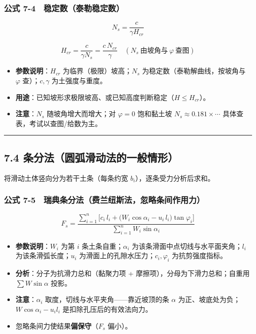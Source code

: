\documentclass[
]{article}
\providecommand{\tightlist}{%
  \setlength{\itemsep}{0pt}\setlength{\parskip}{0pt}}
\begin{document}
\subsubsection{公式
7-4　稳定数（泰勒稳定数）}\label{ux516cux5f0f-7-4-ux7a33ux5b9aux6570ux6cf0ux52d2ux7a33ux5b9aux6570}

\[N_s=\frac{c}{\gamma H_{cr}}\]

\[H_{cr}=\frac{c}{\gamma N_s}=\frac{c\,N_{cr}}{\gamma}\quad(N_s\ \text{由坡角与}\ \varphi\ \text{查图})\]

\begin{itemize}
\tightlist
\item
  \textbf{参数说明}：\(H_{cr}\) 为临界（极限）坡高；\(N_s\)
  为稳定数（泰勒解曲线，按坡角与 \(\varphi\) 查）；\(c,\gamma\)
  为土强度与重度。
\item
  \textbf{用途}：已知坡形求极限坡高、或已知高度判断稳定（\(H\le H_{cr}\)）。
\item
  \textbf{注意}：\(N_s\) 随坡角增大而增大；对 \(\varphi=0\) 饱和黏土坡
  \(N_s\approx0.181\times\cdots\) 具体查表，考试以查图/给数为主。
\end{itemize}

\begin{center}\rule{0.5\linewidth}{0.5pt}\end{center}

\subsection{7.4
条分法（圆弧滑动法的一般情形）}\label{ux6761ux5206ux6cd5ux5706ux5f27ux6ed1ux52a8ux6cd5ux7684ux4e00ux822cux60c5ux5f62}

将滑动土体竖向分为若干土条（每条约宽 \(b_i\)），逐条受力分析后求和。

\subsubsection{公式
7-5　瑞典条分法（费兰纽斯法，忽略条间作用力）}\label{ux516cux5f0f-7-5-ux745eux5178ux6761ux5206ux6cd5ux8d39ux5170ux7ebdux65afux6cd5ux5ffdux7565ux6761ux95f4ux4f5cux7528ux529b}

\[\boxed{F_s=\frac{\sum\limits_{i=1}^{n}\Big[c_i\,l_i+\big(W_i\cos\alpha_i-u_i\,l_i\big)\tan\varphi_i\Big]}{\sum\limits_{i=1}^{n}W_i\sin\alpha_i}}\]

\begin{itemize}
\tightlist
\item
  \textbf{参数说明}：\(W_i\) 为第 \(i\) 条土条自重；\(\alpha_i\)
  为该条滑面中点切线与水平面夹角；\(l_i\) 为该条滑弧长度；\(u_i\)
  为滑面上的孔隙水压力；\(c_i,\varphi_i\) 为抗剪强度指标。
\item
  \textbf{分析}：分子为抗滑力总和（黏聚力项 +
  摩擦项），分母为下滑力总和；自重用 \(\sum W\sin\alpha\) 投影。
\item
  \textbf{注意}：\(\alpha_i\) 取度，切线与水平夹角------靠近坡顶的条
  \(\alpha\) 为正、坡底处为负；\(W\cos\alpha_i-u_il_i\)
  是扣除孔压后的有效法向力。
\item
  忽略条间力使结果\textbf{偏保守}（\(F_s\) 偏小）。
\end{itemize}
\end{document}
